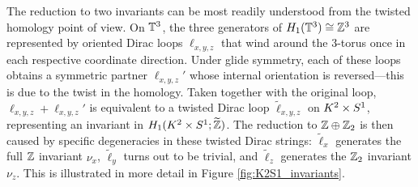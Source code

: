 The reduction to two invariants can be most readily understood from the twisted homology point of view. On $\mathbb{T}^3$, the three generators of $H_1(\mathbb{T}^3)\cong\mathbb{Z}^3$ are represented by oriented Dirac loops $\ell_{x,y,z}$ that wind around the 3-torus once in each respective coordinate direction. Under glide symmetry, each of these loops obtains a symmetric partner $\ell_{x,y,z}'$ whose internal orientation is reversed---this is due to the twist in the homology. Taken together with the original loop, $\ell_{x,y,z} + \ell_{x,y,z}'$ is equivalent to a twisted Dirac loop $\tilde{\ell}_{x,y,z}$ on $K^2\times S^1$, representing an invariant in $H_1(K^2\times S^1;\widetilde{\mathbb{Z}})$. The reduction to $\mathbb{Z}\oplus\mathbb{Z}_2$ is then caused by specific degeneracies in these twisted Dirac strings: $\tilde{\ell}_x$ generates the full $\mathbb{Z}$ invariant $\nu_x$, $\tilde{\ell}_y$ turns out to be trivial, and $\tilde{\ell}_z$ generates the $\mathbb{Z}_2$ invariant $\nu_z$. This is illustrated in more detail in Figure \ref{fig:K2S1_invariants}.
